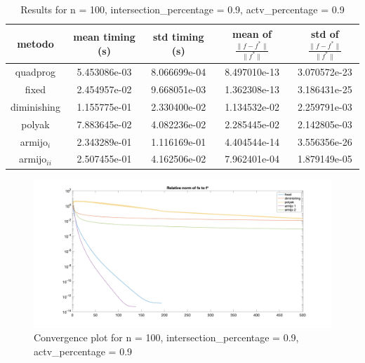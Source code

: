 
\begin{table}[H]
\setlength{\tabcolsep}{10pt} %
\renewcommand{\arraystretch}{1.2} %
\centering
\begin{tabular}{|ccccc|} 
\hline 
\multicolumn{1}{|c||}{metodo}   & \multicolumn{1}{c|}{mean timing (s)}    & \multicolumn{1}{c|}{std timing (s)} & \multicolumn{1}{c|}{mean of $\frac{\|f - f^*\|}{\|f^*\|}$}   & std of $\frac{\|f - f^*\|}{\|f^*\|}$ \\ \hline\hline 
\multicolumn{1}{|c||}{quadprog}       & \multicolumn{1}{c|}{5.453086e-03} & \multicolumn{1}{c|}{8.066699e-04}  & \multicolumn{1}{c|}{8.497010e-13} & 3.070572e-23  \\ \hline \hline
\multicolumn{1}{|c||}{fixed}       & \multicolumn{1}{c|}{2.454957e-02} & \multicolumn{1}{c|}{9.668051e-03}  & \multicolumn{1}{c|}{1.362308e-13} & 3.186431e-25  \\ \hline 
\multicolumn{1}{|c||}{diminishing}       & \multicolumn{1}{c|}{1.155775e-01} & \multicolumn{1}{c|}{2.330400e-02}  & \multicolumn{1}{c|}{1.134532e-02} & 2.259791e-03  \\ \hline 
\multicolumn{1}{|c||}{polyak}       & \multicolumn{1}{c|}{7.883645e-02} & \multicolumn{1}{c|}{4.082236e-02}  & \multicolumn{1}{c|}{2.285445e-02} & 2.142805e-03  \\ \hline 
\multicolumn{1}{|c||}{armijo$_{i}$}       & \multicolumn{1}{c|}{2.343289e-01} & \multicolumn{1}{c|}{1.116169e-01}  & \multicolumn{1}{c|}{4.404544e-14} & 3.556356e-26  \\ \hline 
\multicolumn{1}{|c||}{armijo$_{ii}$}       & \multicolumn{1}{c|}{2.507455e-01} & \multicolumn{1}{c|}{4.162506e-02}  & \multicolumn{1}{c|}{7.962401e-04} & 1.879149e-05  \\ \hline 
\end{tabular} 

\caption{Results for n = 100, intersection\_percentage = 0.9, actv\_percentage = 0.9}
\label{tab:100_zeronove_zeronove}
\end{table}


\begin{figure}[H]
\centering
    \includegraphics[width=20cm, center]{./plots/plot_100_zeronove_zeronove.png}
    \caption{Convergence plot for n = 100, intersection\_percentage = 0.9, actv\_percentage = 0.9}
    \label{fig:100_zeronove_zeronove}
\end{figure} 



